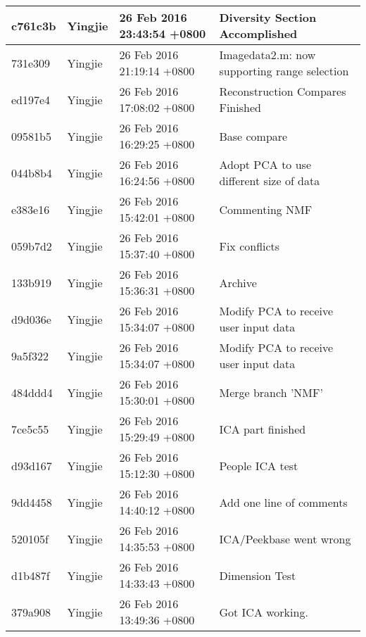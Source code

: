 \begin{longtable}{@{\extracolsep{\fill}}l|l|l|l@{}}
    c761c3b  & Yingjie &  26 Feb 2016 23:43:54 +0800 & Diversity Section Accomplished                       \\ \hline
    731e309  & Yingjie &  26 Feb 2016 21:19:14 +0800 & Imagedata2.m: now supporting range selection         \\ \hline
    ed197e4  & Yingjie &  26 Feb 2016 17:08:02 +0800 & Reconstruction Compares Finished                     \\ \hline
    09581b5  & Yingjie &  26 Feb 2016 16:29:25 +0800 & Base compare                                         \\ \hline
    044b8b4  & Yingjie &  26 Feb 2016 16:24:56 +0800 & Adopt PCA to use different size of data              \\ \hline
    e383e16  & Yingjie &  26 Feb 2016 15:42:01 +0800 & Commenting NMF                                       \\ \hline
    059b7d2  & Yingjie &  26 Feb 2016 15:37:40 +0800 & Fix conflicts                                        \\ \hline
    133b919  & Yingjie &  26 Feb 2016 15:36:31 +0800 & Archive                                              \\ \hline
    d9d036e  & Yingjie &  26 Feb 2016 15:34:07 +0800 & Modify PCA to receive user input data                \\ \hline
    9a5f322  & Yingjie &  26 Feb 2016 15:34:07 +0800 & Modify PCA to receive user input data                \\ \hline
    484ddd4  & Yingjie &  26 Feb 2016 15:30:01 +0800 & Merge branch 'NMF'                                   \\ \hline
    7ce5c55  & Yingjie &  26 Feb 2016 15:29:49 +0800 & ICA part finished                                    \\ \hline
    d93d167  & Yingjie &  26 Feb 2016 15:12:30 +0800 & People ICA test                                      \\ \hline
    9dd4458  & Yingjie &  26 Feb 2016 14:40:12 +0800 & Add one line of comments                             \\ \hline
    520105f  & Yingjie &  26 Feb 2016 14:35:53 +0800 & ICA/Peekbase went wrong                              \\ \hline
    d1b487f  & Yingjie &  26 Feb 2016 14:33:43 +0800 & Dimension Test                                       \\ \hline
    379a908  & Yingjie &  26 Feb 2016 13:49:36 +0800 & Got ICA working.                                     \\ \hline

\end{longtable}
